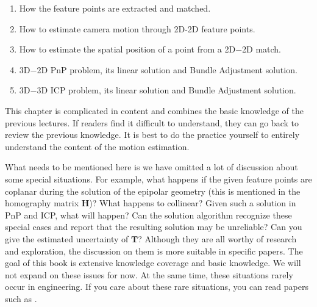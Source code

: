 \begin{enumerate}
	\item How the feature points are extracted and matched.
	\item How to estimate camera motion through 2D-2D feature points.
	\item How to estimate the spatial position of a point from a 2D−2D match.
	\item 3D−2D PnP problem, its linear solution and Bundle Adjustment solution.
	\item 3D−3D ICP problem, its linear solution and Bundle Adjustment solution.
\end{enumerate}

This chapter is complicated in content and combines the basic knowledge of the previous lectures. If readers find it difficult to understand, they can go back to review the previous knowledge. It is best to do the practice yourself to entirely understand the content of the motion estimation.

What needs to be mentioned here is we have omitted a lot of discussion about some special situations. For example, what happens if the given feature points are coplanar during the solution of the epipolar geometry (this is mentioned in the homography matrix $\mathbf{H}$)? What happens to collinear? Given such a solution in PnP and ICP, what will happen? Can the solution algorithm recognize these special cases and report that the resulting solution may be unreliable? Can you give the estimated uncertainty of $\mathbf{T}$? Although they are all worthy of research and exploration, the discussion on them is more suitable in specific papers. The goal of this book is extensive knowledge coverage and basic knowledge. We will not expand on these issues for now. At the same time, these situations rarely occur in engineering. If you care about these rare situations, you can read papers such as \cite{Hartley2003}.

